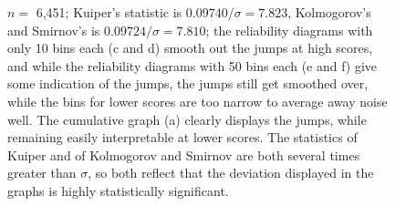 \documentclass{article}
\begin{document}
\begin{figure}
\begin{centering}
\end{centering}
\caption{$n =$ 6,451; Kuiper's statistic is $0.09740 / \sigma = 7.823$,
         Kolmogorov's and Smirnov's is $0.09724 / \sigma = 7.810$;
         the reliability diagrams with only 10 bins each (c and d) smooth out
         the jumps at high scores, and while the reliability diagrams
         with 50 bins each (e and f) give some indication of the jumps,
         the jumps still get smoothed over, while the bins for lower scores are
         too narrow to average away noise well. The cumulative graph (a)
         clearly displays the jumps, while remaining easily interpretable
         at lower scores.
         The statistics of Kuiper and of Kolmogorov and Smirnov are both
         several times greater than $\sigma$,
         so both reflect that the deviation displayed in the graphs
         is highly statistically significant.
}
\label{ex0}
\end{figure}
\end{document}
